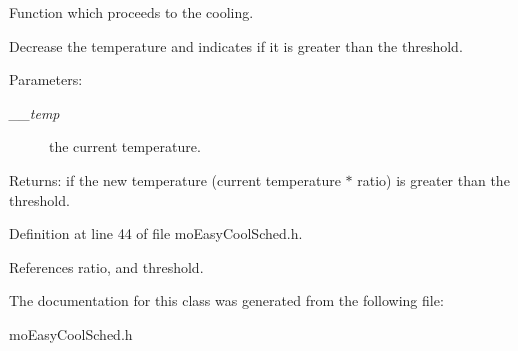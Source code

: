 Function which proceeds to the cooling. 

Decrease the temperature and indicates if it is greater than the threshold.

\begin{Desc}
\item[Parameters:]
\begin{description}
\item[{\em \_\-\_\-temp}]the current temperature. \end{description}
\end{Desc}
\begin{Desc}
\item[Returns:]if the new temperature (current temperature $\ast$ ratio) is greater than the threshold. \end{Desc}


Definition at line 44 of file mo\-Easy\-Cool\-Sched.h.

References ratio, and threshold.

The documentation for this class was generated from the following file:\begin{CompactItemize}
\item 
mo\-Easy\-Cool\-Sched.h\end{CompactItemize}
